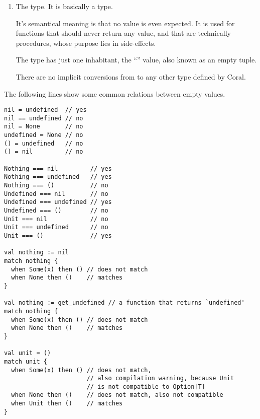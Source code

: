 \begin{enumerate}
  \item The  type. It is basically a  type. 
  
  It's semantical meaning is that no value is even expected. It is used for functions that should never return any value, and that are technically procedures, whose purpose lies in side-effects. 
  
  The type has just one inhabitant, the ``\code{()}'' value, also known as an empty tuple. 
  
  There are no implicit conversions from  to any other type defined by Coral. 
\end{enumerate}

The following lines show some common relations between empty values. 
\begin{lstlisting}
nil = undefined  // yes
nil == undefined // no
nil = None       // no
undefined = None // no
() = undefined   // no
() = nil         // no

Nothing === nil         // yes
Nothing === undefined   // yes
Nothing === ()          // no
Undefined === nil       // no
Undefined === undefined // yes
Undefined === ()        // no
Unit === nil            // no
Unit === undefined      // no
Unit === ()             // yes

val nothing := nil
match nothing {
  when Some(x) then () // does not match
  when None then ()    // matches
}

val nothing := get_undefined // a function that returns `undefined'
match nothing {
  when Some(x) then () // does not match
  when None then ()    // matches
}

val unit = ()
match unit {
  when Some(x) then () // does not match, 
                       // also compilation warning, because Unit 
                       // is not compatible to Option[T]
  when None then ()    // does not match, also not compatible
  when Unit then ()    // matches
}
\end{lstlisting}







